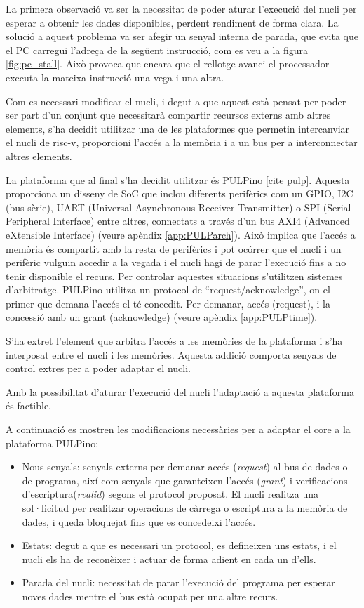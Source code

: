 \documentclass[10pt,a4paper,twocolumn,twoside]{article}
\begin{document}
    La primera observació va ser la necessitat de poder aturar l'execució del nucli per esperar a obtenir les dades disponibles, perdent rendiment de forma clara. La solució a aquest problema va ser afegir un senyal interna de parada, que evita que el PC carregui l'adreça de la següent instrucció, com es veu a la figura \ref{fig:pc_stall}. Això provoca que encara que el rellotge avanci el processador executa la mateixa instrucció una vega i una altra.
    
    Com es necessari modificar el nucli, i degut a que aquest està pensat per poder ser part d'un conjunt que necessitarà compartir recursos externs amb altres elements, s'ha decidit utilitzar una de les plataformes que permetin intercanviar el nucli de risc-v, proporcioni l'accés a la memòria i a un bus per a interconnectar altres elements.
    
    La plataforma que al final s'ha decidit utilitzar és PULPino \ref{cite pulp}. Aquesta proporciona un disseny de SoC que inclou diferents perifèrics com un GPIO, I2C (bus sèrie), UART (Universal Asynchronous Receiver-Transmitter) o SPI (Serial Peripheral Interface) entre altres, connectats a través d'un bus AXI4 (Advanced eXtensible Interface) (veure apèndix \ref{app:PULParch}). Això implica que l'accés a memòria és compartit amb la resta de perifèrics i pot ocórrer que el nucli i un perifèric vulguin accedir a la vegada i el nucli hagi de parar l'execució fins a no tenir disponible el recurs. Per controlar aquestes situacions s'utilitzen sistemes d'arbitratge. PULPino utilitza un protocol de ``request/acknowledge'', on el primer que demana l’accés el té concedit. Per demanar, accés (request), i la concessió amb un grant (acknowledge) (veure apèndix \ref{app:PULPtime}). 
    
    S'ha extret l'element que arbitra l'accés a les memòries de la plataforma i s'ha interposat entre el nucli i les memòries. Aquesta addició comporta senyals de control extres per a poder adaptar el nucli.
    
    Amb la possibilitat d'aturar l'execució del nucli l'adaptació a aquesta plataforma és factible.
    
    A continuació es mostren les modificacions necessàries per a adaptar el core a la plataforma PULPino:
    \begin{itemize}
        \item Nous senyals: senyals externs per demanar accés (\textit{request}) al bus de dades o de programa, així com senyals que garanteixen l'accés (\textit{grant}) i verificacions d'escriptura(\textit{rvalid}) segons el protocol proposat. El nucli realitza una sol·licitud per realitzar operacions de càrrega o escriptura a la memòria de dades, i queda bloquejat fins que es concedeixi l’accés.
        \item Estats: degut a que es necessari un protocol, es defineixen uns estats, i el nucli els ha de reconèixer i actuar de forma adient en cada un d'ells. 
        \item Parada del nucli: necessitat de parar l'execució del programa per esperar noves dades mentre el bus està ocupat per una altre recurs.

    \end{itemize}
    
\end{document}
